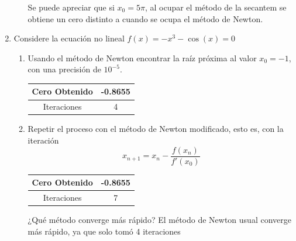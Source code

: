 \documentclass{udparticle}
\begin{document}
\begin{enumerate}
\begin{enumerate}
Se puede apreciar que si $x_{0}=5\pi$, al ocupar el método de la secantem se obtiene un cero distinto a cuando se ocupa el método de Newton.	
	\end{enumerate}
		

\item Considere la ecuación no lineal $f(x) = -x^{3} - \cos(x) = 0$
    \begin{enumerate}
    
        \item Usando el método de Newton encontrar la raíz próxima al valor $x_{0}=-1$, con una precisión de $10^{-5}$.\\
        \begin{table}[H]
        \centering
        \begin{tabular} { |c|c|}
        
        \hline
        Cero Obtenido &  -0.8655\\
        \hline
        Iteraciones   &    4\\
        \hline
        
        \end{tabular}
        \end{table}
        
        \item Repetir el proceso con el método de Newton modificado, esto es, con la iteración $$x_{n+1} = x_{n} - \frac {f(x_{n})} {f'(x_{0})} $$
        \begin{table}[H]
        \centering
        \begin{tabular} { |c|c|}
        
        \hline
        Cero Obtenido &  -0.8655\\
        \hline
        Iteraciones   &    7\\
        \hline
        
        \end{tabular}
        \end{table}
        ¿Qué método converge más rápido?
        El método de Newton usual converge más rápido, ya que solo tomó 4 iteraciones %
    \end{enumerate}


\end{enumerate}
\end{document}
